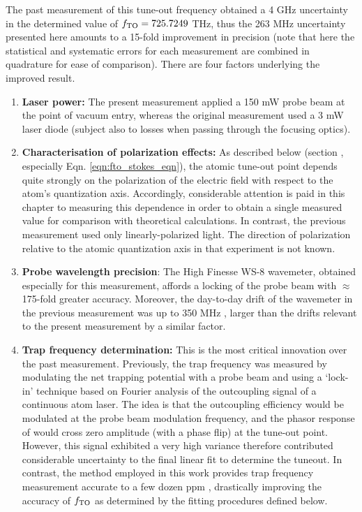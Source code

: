 	The past measurement of this tune-out frequency \cite{Henson15} obtained a 4 GHz uncertainty in the determined value of $f_\mathrm{TO} = 725.7249$ THz, thus the 263 MHz uncertainty presented here amounts to a 15-fold improvement in precision (note that here the statistical and systematic errors for each measurement are combined in quadrature for ease of comparison).
	There are four factors underlying the improved result.
	\begin{enumerate}
		\item \textbf{Laser power:} The present measurement applied a 150 mW probe beam at the point of vacuum entry, whereas the original measurement used a 3 mW laser diode (subject also to losses when passing through the focusing optics). 
		\item \textbf{Characterisation of polarization effects:} As described below (section \label{sec:polz_dep}, especially Eqn. \ref{eqn:fto_stokes_eqn}), the atomic tune-out point depends quite strongly on the polarization of the electric field with respect to the atom's quantization axis. Accordingly, considerable attention is paid in this chapter to measuring this dependence in order to obtain a single measured value for comparison with theoretical calculations. In contrast, the previous measurement used only linearly-polarized light. The direction of polarization relative to the atomic quantization axis in that experiment is not known. 
		\item \textbf{Probe wavelength precision}: The High Finesse WS-8 wavemeter, obtained especially for this measurement, affords a locking of the probe beam with $\approx$175-fold greater accuracy. Moreover, the day-to-day drift of the wavemeter in the previous measurement was up to 350 MHz \cite{HensonHonsThesis}, larger than the drifts relevant to the present measurement by a similar factor. 
		\item \textbf{Trap frequency determination:} This is the most critical innovation over the past measurement. Previously, the trap frequency was measured by modulating the net trapping potential with a probe beam and using a `lock-in' technique \cite{HensonHonsThesis} based on Fourier analysis of the outcoupling signal of a continuous atom laser. The idea is that the outcoupling efficiency would be modulated at the probe beam modulation frequency, and the phasor response of would cross zero amplitude (with a phase flip) at the tune-out point. However, this signal exhibited a very high variance therefore contributed considerable uncertainty to the final linear fit to determine the tuneout. In contrast, the method employed in this work provides trap frequency measurement accurate to a few dozen ppm \cite{Henson22_PAL}, drastically improving the accuracy of $f_\mathrm{TO}$ as determined by the fitting procedures defined below.
	\end{enumerate}


